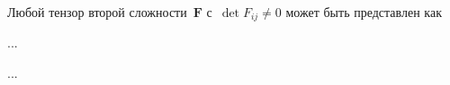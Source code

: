 

\label{para:polardecomposition}

\begin{otherlanguage}{russian}

Любой тензор второй сложности~${\bm{F}}$ с~${\operatorname{det} F_{ij} \neq 0}$ может быть представлен как

...

\newpage ...



\end{otherlanguage}



\newpage



